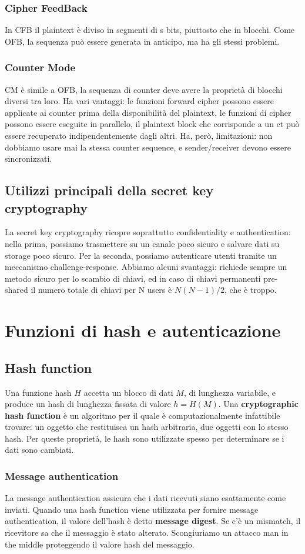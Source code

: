 \documentclass[11pt]{article}
\begin{document}
\subsubsection{Cipher FeedBack}
In CFB il plaintext è diviso in segmenti di s bits, piuttosto che in blocchi. Come OFB, la sequenza può essere generata in anticipo, ma ha gli stessi problemi. 
\subsubsection{Counter Mode}
CM è simile a OFB, la sequenza di counter deve avere la proprietà di blocchi diversi tra loro. Ha vari vantaggi: le funzioni forward cipher possono essere applicate ai counter prima della disponibilità del plaintext, le funzioni di cipher possono essere eseguite in parallelo, il plaintext block che corrisponde a un ct può essere recuperato indipendentemente dagli altri. Ha, però, limitazioni: non dobbiamo usare mai la stessa counter sequence, e sender/receiver devono essere sincronizzati.
\subsection{Utilizzi principali della secret key cryptography}
La secret key cryptography ricopre soprattutto confidentiality e authentication: nella prima, possiamo trasmettere su un canale poco sicuro e salvare dati su storage poco sicuro. Per la seconda, possiamo autenticare utenti tramite un meccanismo challenge-response.
Abbiamo alcuni svantaggi: richiede sempre un metodo sicuro per lo scambio di chiavi, ed in caso di chiavi permanenti pre-shared il numero totale di chiavi per N users è $N(N-1)/2$, che è troppo.

\section{Funzioni di hash e autenticazione}
\subsection{Hash function}
Una funzione hash $H$ accetta un blocco di dati $M$, di lunghezza variabile, e produce un hash di lunghezza fissata di valore $h=H(M)$. Una \textbf{cryptographic hash function} è un algoritmo per il quale è computazionalmente infattibile trovare: un oggetto che restituisca un hash arbitraria, due oggetti con lo stesso hash. Per queste proprietà, le hash sono utilizzate spesso per determinare se i dati sono cambiati. 
\subsubsection{Message authentication}
La message authentication assicura che i dati ricevuti siano esattamente come inviati. Quando una hash function viene utilizzata per fornire message authentication, il valore dell'hash è detto \textbf{message digest}. Se c'è un mismatch, il ricevitore sa che il messaggio è stato alterato. 
Scongiuriamo un attacco man in the middle proteggendo il valore hash del messaggio.
\end{document}
